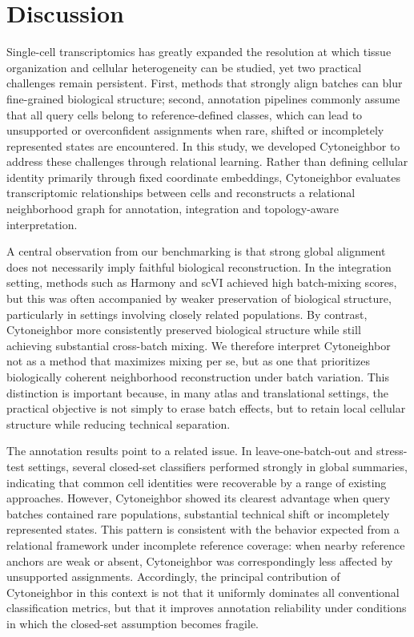 \documentclass[11pt]{article}
\begin{document}
\section{Discussion}

Single-cell transcriptomics has greatly expanded the resolution at which tissue organization and cellular heterogeneity can be studied, yet two practical challenges remain persistent. First, methods that strongly align batches can blur fine-grained biological structure; second, annotation pipelines commonly assume that all query cells belong to reference-defined classes, which can lead to unsupported or overconfident assignments when rare, shifted or incompletely represented states are encountered. In this study, we developed Cytoneighbor to address these challenges through relational learning. Rather than defining cellular identity primarily through fixed coordinate embeddings, Cytoneighbor evaluates transcriptomic relationships between cells and reconstructs a relational neighborhood graph for annotation, integration and topology-aware interpretation.

A central observation from our benchmarking is that strong global alignment does not necessarily imply faithful biological reconstruction. In the integration setting, methods such as Harmony and scVI achieved high batch-mixing scores, but this was often accompanied by weaker preservation of biological structure, particularly in settings involving closely related populations. By contrast, Cytoneighbor more consistently preserved biological structure while still achieving substantial cross-batch mixing. We therefore interpret Cytoneighbor not as a method that maximizes mixing per se, but as one that prioritizes biologically coherent neighborhood reconstruction under batch variation. This distinction is important because, in many atlas and translational settings, the practical objective is not simply to erase batch effects, but to retain local cellular structure while reducing technical separation.

The annotation results point to a related issue. In leave-one-batch-out and stress-test settings, several closed-set classifiers performed strongly in global summaries, indicating that common cell identities were recoverable by a range of existing approaches. However, Cytoneighbor showed its clearest advantage when query batches contained rare populations, substantial technical shift or incompletely represented states. This pattern is consistent with the behavior expected from a relational framework under incomplete reference coverage: when nearby reference anchors are weak or absent, Cytoneighbor was correspondingly less affected by unsupported assignments. Accordingly, the principal contribution of Cytoneighbor in this context is not that it uniformly dominates all conventional classification metrics, but that it improves annotation reliability under conditions in which the closed-set assumption becomes fragile.
\end{document}
